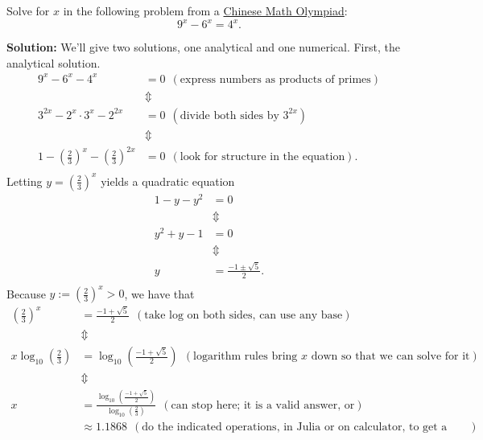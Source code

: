\begin{example} Solve for $x$ in the following problem from a \href{https://www.youtube.com/watch?v=zHBqW7uhJlk}{Chinese Math Olympiad}:
$$9^x - 6^x = 4^x. $$    
\end{example}
\textbf{Solution:} We'll give two solutions, one analytical and one numerical. First, the analytical solution.
\begin{equation}
   \begin{aligned}
    9^x - 6^x - 4^x & =0 ~~(\text{express numbers as products of primes})\\
    & \Updownarrow \\
    3^{2x} - 2^x \cdot 3^x - 2^{2x} & =0   ~~(\text{divide both sides by }3^{2x})\\  
        & \Updownarrow \\
    1 - \left( \frac{2}{3} \right)^x - \left( \frac{2}{3} \right)^{2x} & =0   ~~(\text{look for structure in the equation}). \\  
\end{aligned} 
\end{equation}
Letting $y=\left( \frac{2}{3} \right)^x$ yields a quadratic equation
\begin{equation}
   \begin{aligned}
    1 - y - y^2& =0 \\
    & \Updownarrow \\
   y^2 + y -1  & =0 \\
    & \Updownarrow \\
   y&= \frac{-1 \pm \sqrt{5}}{2}. \\
\end{aligned} 
\end{equation}
Because $y:=\left( \frac{2}{3} \right)^x>0$, we have that
\begin{equation}
   \begin{aligned}
 \left( \frac{2}{3} \right)^x & =\frac{-1 + \sqrt{5}}{2}  ~~(\text{take log on both sides, can use any base})\\
    & \Updownarrow \\
x \log_{10}  \left( \frac{2}{3} \right) & =  \log_{10}\left( \frac{-1 + \sqrt{5}}{2} \right) ~~(\text{logarithm rules bring $x$ down so that we can solve for it})\\
  & \Updownarrow \\
  x &= \frac{\log_{10}\left( \frac{-1 + \sqrt{5}}{2} \right)}{\log_{10}  \left( \frac{2}{3} \right) } ~~(\text{can stop here; it is a valid answer, or})\\[1em]
  & \approx  1.1868 ~~(\text{do the indicated operations, in Julia or on calculator, to get a decimal approx.})
\end{aligned} 
\end{equation}

